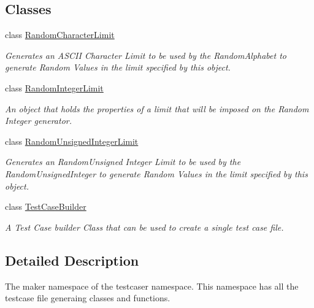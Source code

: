 \subsection*{Classes}
\begin{DoxyCompactItemize}
\item 
class \mbox{\hyperlink{classtestcaser_1_1maker_1_1RandomCharacterLimit}{Random\+Character\+Limit}}
\begin{DoxyCompactList}\small\item\em Generates an A\+S\+C\+II Character Limit to be used by the Random\+Alphabet to generate Random Values in the limit specified by this object. \end{DoxyCompactList}\item 
class \mbox{\hyperlink{classtestcaser_1_1maker_1_1RandomIntegerLimit}{Random\+Integer\+Limit}}
\begin{DoxyCompactList}\small\item\em An object that holds the properties of a limit that will be imposed on the Random Integer generator. \end{DoxyCompactList}\item 
class \mbox{\hyperlink{classtestcaser_1_1maker_1_1RandomUnsignedIntegerLimit}{Random\+Unsigned\+Integer\+Limit}}
\begin{DoxyCompactList}\small\item\em Generates an Random\+Unsigned Integer Limit to be used by the Random\+Unsigned\+Integer to generate Random Values in the limit specified by this object. \end{DoxyCompactList}\item 
class \mbox{\hyperlink{classtestcaser_1_1maker_1_1TestCaseBuilder}{Test\+Case\+Builder}}
\begin{DoxyCompactList}\small\item\em A Test Case builder Class that can be used to create a single test case file. \end{DoxyCompactList}\end{DoxyCompactItemize}


\subsection{Detailed Description}
The maker namespace of the testcaser namespace. This namespace has all the testcase file generaing classes and functions. 


